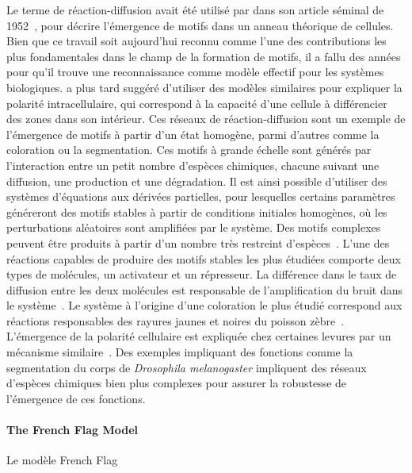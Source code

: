 {Le terme de réaction-diffusion avait été utilisé par  dans son article séminal de 1952~\cite{turing1952chemical}, pour décrire l'émergence de motifs dans un anneau théorique de cellules. Bien que ce travail soit aujourd'hui reconnu comme l'une des contributions les plus fondamentales dans le champ de la formation de motifs, il a fallu des années pour qu'il trouve une reconnaissance comme modèle effectif pour les systèmes biologiques. \cite{gierer1972theory} a plus tard suggéré d'utiliser des modèles similaires pour expliquer la polarité intracellulaire, qui correspond à la capacité d'une cellule à différencier des zones dans son intérieur. Ces réseaux de réaction-diffusion sont un exemple de l'émergence de motifs à partir d'un état homogène, parmi d'autres comme la coloration ou la segmentation. Ces motifs à grande échelle sont générés par l'interaction entre un petit nombre d'espèces chimiques, chacune suivant une diffusion, une production et une dégradation. Il est ainsi possible d'utiliser des systèmes d'équations aux dérivées partielles, pour lesquelles certains paramètres généreront des motifs stables à partir de conditions initiales homogènes, où les perturbations aléatoires sont amplifiées par le système. Des motifs complexes peuvent être produits à partir d'un nombre très restreint d'espèces~\cite{kondo2010reaction}. L'une des réactions capables de produire des motifs stables les plus étudiées comporte deux types de molécules, un activateur et un répresseur. La différence dans le taux de diffusion entre les deux molécules est responsable de l'amplification du bruit dans le système~\cite{gierer1972theory}. Le système à l'origine d'une coloration le plus étudié correspond aux réactions responsables des rayures jaunes et noires du poisson zèbre~\cite{nakamasu2009interactions}. L'émergence de la polarité cellulaire est expliquée chez certaines levures par un mécanisme similaire~\cite{goryachev2008dynamics}. Des exemples impliquant des fonctions comme la segmentation du corps de \textit{Drosophila melanogaster} impliquent des réseaux d'espèces chimiques bien plus complexes pour assurer la robustesse de l'émergence de ces fonctions.
}


\paragraph{The French Flag Model}{Le modèle French Flag}

